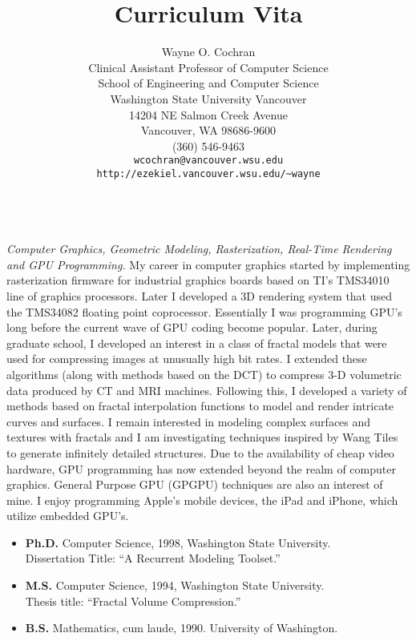 \documentclass[10pt]{article}
\title{Curriculum Vita}
\author{Wayne O. Cochran\\
       Clinical Assistant Professor of Computer Science\\
       School of Engineering and Computer Science\\
       Washington State University Vancouver\\
       14204 NE Salmon Creek Avenue\\
       Vancouver, WA 98686-9600\\
       (360) 546-9463\\
       {\tt wcochran@vancouver.wsu.edu} \\
       {\tt http://ezekiel.vancouver.wsu.edu/\~{}wayne}}
\begin{document}
\maketitle




\\

{\em Computer Graphics, Geometric Modeling, Rasterization, Real-Time Rendering
and GPU Programming.}
My career in computer graphics started by 
implementing rasterization firmware
for industrial graphics boards based on
TI's TMS34010 line of graphics processors.
Later I developed a 3D rendering system
that used the TMS34082 floating  point coprocessor.
Essentially I was programming GPU's long before
the current wave of GPU coding become popular.
Later, during graduate school, I developed an interest
in a class of fractal models that were used for compressing
images at unusually high bit rates. I extended these
algorithms (along with methods based on the DCT)
to compress 3-D volumetric data produced by CT
and MRI machines. Following this, I developed a variety of methods
based on fractal interpolation functions to model
and render intricate curves and surfaces.
I remain interested in modeling 
complex surfaces and textures with fractals and I am
investigating techniques inspired by
Wang Tiles to generate infinitely detailed structures.
Due to the availability of cheap video hardware,
GPU programming
has now extended beyond the realm of computer graphics.
General Purpose GPU (GPGPU) techniques are also
an interest of mine.
I enjoy programming Apple's mobile devices, the iPad and iPhone,
which utilize embedded GPU's.

\vspace{0.5cm}


\begin{itemize}
\item {\bf Ph.D.} Computer Science, 1998,
Washington State University. \\
Dissertation Title: ``A Recurrent Modeling Toolset.''

\item {\bf M.S.} Computer Science, 1994,
Washington State University. \\
Thesis title: ``Fractal Volume Compression.''

\item {\bf B.S.} Mathematics, cum laude, 1990.
University of Washington. 
\end{itemize}
\end{document}
